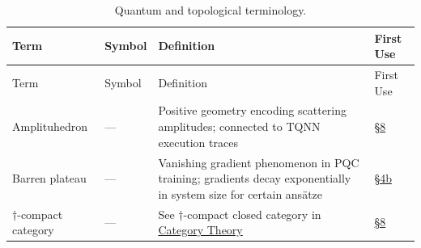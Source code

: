 \documentclass[
]{article}
\begin{document}
\begin{longtable}[]{@{}
  >{\raggedright\arraybackslash}p{}
  >{\centering\arraybackslash}p{}
  >{\raggedright\arraybackslash}p{}
  >{\centering\arraybackslash}p{}@{}}
\caption{Quantum and topological
terminology.}\label{tbl:not-quantum}\tabularnewline
\toprule\noalign{}
\begin{minipage}[b]{\linewidth}\raggedright
Term
\end{minipage} & \begin{minipage}[b]{\linewidth}\centering
Symbol
\end{minipage} & \begin{minipage}[b]{\linewidth}\raggedright
Definition
\end{minipage} & \begin{minipage}[b]{\linewidth}\centering
First Use
\end{minipage} \\
\midrule\noalign{}
\endfirsthead
\toprule\noalign{}
\begin{minipage}[b]{\linewidth}\raggedright
Term
\end{minipage} & \begin{minipage}[b]{\linewidth}\centering
Symbol
\end{minipage} & \begin{minipage}[b]{\linewidth}\raggedright
Definition
\end{minipage} & \begin{minipage}[b]{\linewidth}\centering
First Use
\end{minipage} \\
\midrule\noalign{}
\endhead
\bottomrule\noalign{}
\endlastfoot
Amplituhedron & --- & Positive geometry encoding scattering amplitudes;
connected to TQNN execution traces &
\href{08_quantum_active_inference.md\#sec:quantum-active-inference}{§8} \\
Barren plateau & --- & Vanishing gradient phenomenon in PQC training;
gradients decay exponentially in system size for certain ansätze &
\href{04b_compact_closure_complexity.md\#sec:compact-closure-complexity}{§4b} \\
\(\dagger\)-compact category & --- & See \(\dagger\)-compact closed
category in \href{11b_notation.md\#sec:notation-category}{Category
Theory} &
\href{08_quantum_active_inference.md\#sec:quantum-active-inference}{§8} \\

\end{longtable}
\end{document}
